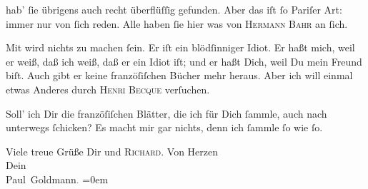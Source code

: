                hab’{ }ſie {\pb}übrigens auch recht überflüſſig gefunden.
               Aber das iſt{ }ſo Pariſer Art: immer nur von{ }ſich
               reden. Alle haben{ }ſie hier was von \textsc{Hermann Bahr} an{ }ſich.\pend
           
\pstart
           Mit \label{K_L02738-7v}\label{K_L02738-7} wird nichts zu machen{ }ſein. Er iſt ein blödſinniger Idiot. Er haßt mich, weil
               er weiß, daß ich weiß, daß er ein Idiot iſt; und er {\pb}haßt Dich, weil Du mein Freund biſt. Auch gibt er keine franzöſiſchen Bücher mehr
               heraus. Aber ich will einmal etwas Anderes durch \textsc{Henri Becque} verſuchen.\pend
           
\pstart
           Soll’ ich Dir die franzöſiſchen
               Blätter, die ich für Dich{ }ſammle, auch nach unterwegs{ }ſchicken? Es macht mir gar
               nichts, denn ich{ }ſammle{ }ſo wie{ }ſo.\pend
           
\pstart
           Viele treue Grüße Dir und \textsc{Richard}. Von Herzen {\\[\baselineskip]}Dein {\\[\baselineskip]}\spacefill\mbox{Paul Goldmann\textcolor{gray}{.}}\pend
           \leftskip=0em{}\endnumbering{}  \newcommand{\dateiname}{L02738}\newcommand{\titel}{Paul Goldmann an Arthur Schnitzler, 29. 6. [1895]}\newcommand{\editorInnen}{Martin Anton Müller und Laura Untner}
